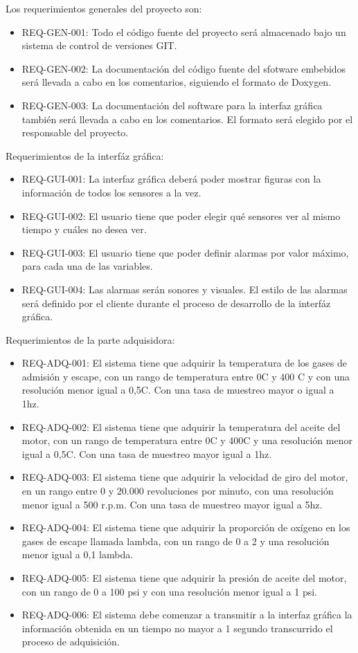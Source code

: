 Los requerimientos generales del proyecto son:
\begin{itemize}
\item REQ-GEN-001: Todo el código fuente del proyecto será almacenado bajo un sistema de control de versiones GIT.
\item REQ-GEN-002: La documentación del código fuente del sfotware embebidos será llevada a cabo en los comentarios, siguiendo el formato de Doxygen.
\item REQ-GEN-003: La documentación del software para la interfaz gráfica también será llevada a cabo en los comentarios. El formato será elegido por el responsable del proyecto.
\end{itemize}

Requerimientos de la interfáz gráfica:
\begin{itemize}
\item REQ-GUI-001: La interfaz gráfica deberá poder mostrar figuras con la información de todos los sensores a la vez.
\item REQ-GUI-002: El usuario tiene que poder elegir qué sensores ver al mismo tiempo y cuáles no desea ver.
\item REQ-GUI-003: El usuario tiene que poder definir alarmas por valor máximo, para cada una de las variables.
\item REQ-GUI-004: Las alarmas serán sonores y visuales. El estilo de las alarmas será definido por el cliente durante el proceso de desarrollo de la interfáz gráfica.
\end{itemize}

Requerimientos de la parte adquisidora:
\begin{itemize}
\item REQ-ADQ-001: El sistema tiene que adquirir la temperatura de los gases de admisión y escape, con un rango de temperatura entre 0\degree C y 400 \degree C y con una resolución menor igual a 0,5\degree C. Con una tasa de muestreo mayor o igual a 1hz.
\item REQ-ADQ-002: El sistema tiene que adquirir la temperatura del aceite del motor, con un rango de temperatura entre 0\degree C y 400\degree C y una resolución menor igual a 0,5\degree C. Con una tasa de muestreo mayor igual a 1hz.
\item REQ-ADQ-003: El sistema tiene que adquirir la velocidad de giro del motor, en un rango entre 0 y 20.000 revoluciones por minuto, con una resolución menor igual a 500 r.p.m. Con una tasa de muestreo mayor igual a 5hz.
\item REQ-ADQ-004: El sistema tiene que adquirir la proporción de oxígeno en los gases de escape llamada lambda, con un rango de 0 a 2 y una resolución menor igual a 0,1 lambda.
\item REQ-ADQ-005: El sistema tiene que adquirir la presión de aceite del motor, con un rango de 0 a 100 psi y con una resolución menor igual a 1 psi.
\item REQ-ADQ-006: El sistema debe comenzar a transmitir a la interfaz gráfica la información obtenida en un tiempo no mayor a 1 segundo transcurrido el proceso de adquisición.
\end{itemize}

